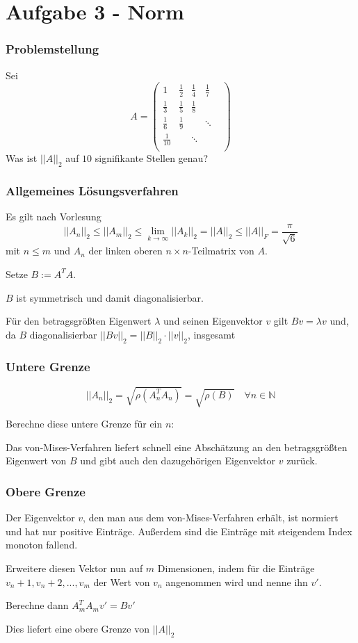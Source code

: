 \documentclass[xcolor = dvipsnames, notheorems, 10pt]{beamer}
\theoremstyle{definition}
\begin{document}
\section{Aufgabe 3 - Norm}
\begin{frame}
\frametitle{Problemstellung}
	Sei
		$$A = \begin{pmatrix}
			1				& \frac{1}{2} 	& \frac{1}{4} 	& \frac{1}{7} 	& \\
			\frac{1}{3}		& \frac{1}{5}	& \frac{1}{8}	& 				& \\
			\frac{1}{6}		& \frac{1}{9}	&				& \ddots		& \\
			\frac{1}{10}	& 				& \ddots		&				& \\
		\end{pmatrix}$$
	Was ist $||A||_2$ auf $10$ signifikante Stellen genau?
\end{frame}
\begin{frame}
\frametitle{Allgemeines Lösungsverfahren}
	Es gilt nach Vorlesung $$||A_n||_2 \leq ||A_m||_2 \leq \lim_{k \to \infty} ||A_k||_2 = ||A||_2 \leq ||A||_F = \frac{\pi}{\sqrt{6}}$$
	mit $n \leq m$ und $A_n$ der linken oberen $n\times n$-Teilmatrix von $A$.

	Setze $B := A^T A$.
	
	$B$ ist symmetrisch und damit diagonalisierbar.

	Für den betragsgrößten Eigenwert $\lambda$ und seinen Eigenvektor $v$ gilt $Bv = \lambda v$ und, da $B$ diagonalisierbar
	$||Bv||_2 = ||B||_2 \cdot ||v||_2$, insgesamt



\end{frame}
\begin{frame}
\frametitle{Untere Grenze}
	$$||A_n||_2 = \sqrt{\rho(A_n^T A_n)} = \sqrt{\rho(B)} \quad \forall n \in \mathbb{N}$$
	
	Berechne diese untere Grenze für ein $n$:
	
	Das von-Mises-Verfahren liefert schnell eine Abschätzung an den betragsgrößten Eigenwert von $B$ und gibt auch den dazugehörigen Eigenvektor $v$ zurück.


\end{frame}
\begin{frame}
\frametitle{Obere Grenze}
	Der Eigenvektor $v$, den man aus dem von-Mises-Verfahren erhält, ist normiert und hat nur positive Einträge. Außerdem sind die Einträge mit steigendem Index monoton fallend.

	Erweitere diesen Vektor nun auf $m$ Dimensionen, indem für die Einträge $v_n+1, v_n+2, ..., v_m$ der Wert von $v_n$ angenommen wird und nenne ihn $v'$.
	
	Berechne dann $A_m^T A_m v' = B v'$
	
	Dies liefert eine obere Grenze von $||A||_2$
\end{frame}
\end{document}
